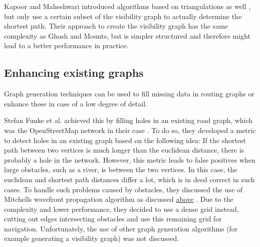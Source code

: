 		Kapoor and Maheshwari introduced algorithms based on triangulations as well \cite{kapoor-shortest-path-vgraph}, but only use a certain subset of the visibility graph to actually determine the shortest path.
		Their approach to create the visibility graph has the same complexity as Ghosh and Mounts, but is simpler structured and therefore might lead to a better performance in practice.
		
		
	
	\subsection{Enhancing existing graphs}
	
		Graph generation techniques can be used to fill missing data in routing graphs or enhance these in case of a low degree of detail.
		
		Stefan Funke et al. achieved this by filling holes in an existing road graph, which was the OpenStreetMap network in their case \cite{funke-osm-extrapolation}.
		To do so, they developed a metric to detect holes in an existing graph based on the following idea:
		If the shortest path between two vertices is much longer than the euclidean distance, there is probably a hole in the network.
		However, this metric leads to false positives when large obstacles, such as a river, is between the two vertices.
		In this case, the euclidean and shortest path distances differ a lot, which is in deed correct in such cases.
		To handle such problems caused by obstacles, they discussed the use of Mitchells wavefront propagation algorithm as discussed \hyperref[related-work:mitchell]{above} \cite[4]{funke-osm-extrapolation}.
		Due to the complexity and lower performance, they decided to use a dense grid instead, cutting out edges intersecting obstacles and use this remaining grid for navigation.
		Unfortunately, the use of other graph generation algorithms (for example generating a visibility graph) was not discussed.
		
